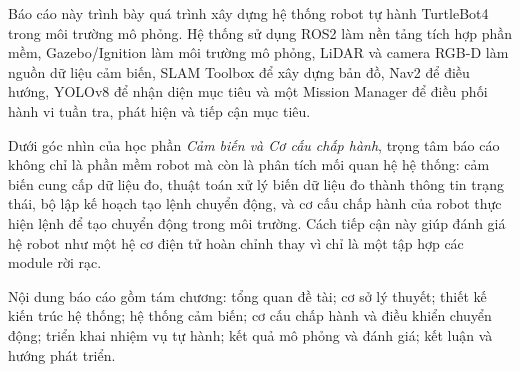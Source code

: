 Báo cáo này trình bày quá trình xây dựng hệ thống robot tự hành TurtleBot4 trong môi trường mô phỏng. Hệ thống sử dụng ROS2 làm nền tảng tích hợp phần mềm, Gazebo/Ignition làm môi trường mô phỏng, LiDAR và camera RGB-D làm nguồn dữ liệu cảm biến, SLAM Toolbox để xây dựng bản đồ, Nav2 để điều hướng, YOLOv8 để nhận diện mục tiêu và một Mission Manager để điều phối hành vi tuần tra, phát hiện và tiếp cận mục tiêu.

Dưới góc nhìn của học phần \textit{Cảm biến và Cơ cấu chấp hành}, trọng tâm báo cáo không chỉ là phần mềm robot mà còn là phân tích mối quan hệ hệ thống: cảm biến cung cấp dữ liệu đo, thuật toán xử lý biến dữ liệu đo thành thông tin trạng thái, bộ lập kế hoạch tạo lệnh chuyển động, và cơ cấu chấp hành của robot thực hiện lệnh để tạo chuyển động trong môi trường. Cách tiếp cận này giúp đánh giá hệ robot như một hệ cơ điện tử hoàn chỉnh thay vì chỉ là một tập hợp các module rời rạc.

Nội dung báo cáo gồm tám chương: tổng quan đề tài; cơ sở lý thuyết; thiết kế kiến trúc hệ thống; hệ thống cảm biến; cơ cấu chấp hành và điều khiển chuyển động; triển khai nhiệm vụ tự hành; kết quả mô phỏng và đánh giá; kết luận và hướng phát triển.
\newpage
